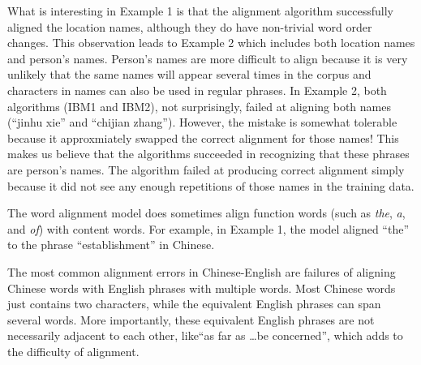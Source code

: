 \documentclass[letterpaper]{article}
\begin{document}
What is interesting in Example 1 is that the alignment algorithm successfully aligned the location names, although they do have non-trivial word order changes.
This observation leads to Example 2 which includes both location names and person's names.
Person's names are more difficult to align because it is very unlikely that the same names will appear several times in the corpus and characters in names can also be used 
in regular phrases.
In Example 2, both algorithms (IBM1 and IBM2), not surprisingly, failed at aligning both names (``jinhu xie'' and ``chijian zhang'').
However, the mistake is somewhat tolerable because it approxmiately swapped the correct alignment for those names! This makes us believe that the algorithms succeeded in recognizing that these phrases are person's names. The algorithm failed at producing correct alignment simply because it did not see any enough repetitions of those names in the training data.

\vspace{0.1cm}

The word alignment model does sometimes align function words (such as \emph{the}, \emph{a}, and \emph{of}) with content words. For example, in Example 1, the model aligned ``the'' to the phrase ``establishment'' in Chinese.

\vspace{0.1cm}

The most common alignment errors in Chinese-English are failures of aligning Chinese words with English phrases with multiple words. Most Chinese words just contains two characters, while the equivalent English phrases can span several words. More importantly, these equivalent English phrases are not necessarily adjacent to each other, like``as far as \dots be concerned'', which adds to the difficulty of alignment.
\end{document}
